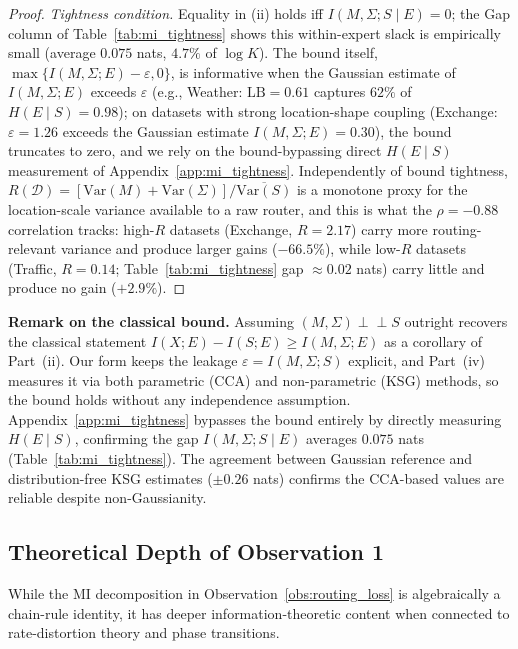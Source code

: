 \documentclass{article}
\begin{document}
\begin{proof}
\emph{Tightness condition.} Equality in (ii) holds iff $I(M,\Sigma; S \mid E) = 0$; the Gap column of Table~\ref{tab:mi_tightness} shows this within-expert slack is empirically small (average $0.075$ nats, $4.7\%$ of $\log K$). The bound itself, $\max\{I(M,\Sigma;E)-\varepsilon, 0\}$, is informative when the Gaussian estimate of $I(M,\Sigma;E)$ exceeds $\varepsilon$ (e.g., Weather: $\mathrm{LB}{=}0.61$ captures $62\%$ of $H(E\mid S){=}0.98$); on datasets with strong location-shape coupling (Exchange: $\varepsilon{=}1.26$ exceeds the Gaussian estimate $I(M,\Sigma;E){=}0.30$), the bound truncates to zero, and we rely on the bound-bypassing direct $H(E\mid S)$ measurement of Appendix~\ref{app:mi_tightness}. Independently of bound tightness, $R(\mathcal{D}) = [\mathrm{Var}(M) + \mathrm{Var}(\Sigma)] / \overline{\mathrm{Var}(S)}$ is a monotone proxy for the location-scale variance available to a raw router, and this is what the $\rho{=}{-}0.88$ correlation tracks: high-$R$ datasets (Exchange, $R{=}2.17$) carry more routing-relevant variance and produce larger gains ($-66.5\%$), while low-$R$ datasets (Traffic, $R{=}0.14$; Table~\ref{tab:mi_tightness} gap ${\approx}0.02$ nats) carry little and produce no gain ($+2.9\%$).
\end{proof}

\textbf{Remark on the classical bound.} Assuming $(M,\Sigma) \perp\!\!\!\perp S$ outright recovers the classical statement $I(X;E)-I(S;E)\geq I(M,\Sigma;E)$ as a corollary of Part~(ii). Our form keeps the leakage $\varepsilon = I(M,\Sigma; S)$ explicit, and Part~(iv) measures it via both parametric (CCA) and non-parametric (KSG) methods, so the bound holds without any independence assumption. Appendix~\ref{app:mi_tightness} bypasses the bound entirely by directly measuring $H(E \mid S)$, confirming the gap $I(M,\Sigma; S \mid E)$ averages $0.075$ nats (Table~\ref{tab:mi_tightness}). The agreement between Gaussian reference and distribution-free KSG estimates ($\pm 0.26$ nats) confirms the CCA-based values are reliable despite non-Gaussianity.

\subsection{Theoretical Depth of Observation 1}
\label{app:prop2_depth}

While the MI decomposition in Observation~\ref{obs:routing_loss} is algebraically a chain-rule identity, it has deeper information-theoretic content when connected to rate-distortion theory and phase transitions.
\end{document}
